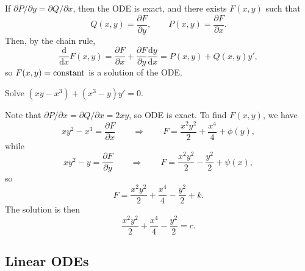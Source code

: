 \documentclass[letter-paper]{tufte-book}
\newenvironment{example}[1][Example]{\begin{trivlist}
\item[\hskip \labelsep {\bfseries #1}]}{\end{trivlist}}
\newcommand{\dy}{\partial}
\newcommand{\ddy}[2]{\frac{\dy#1}{\dy#2}}
\begin{document}
If $\dy P/\dy y=\dy Q/\dy x$, then the ODE is exact, and there exists $F(x,y)$
such that
\begin{equation*}
  Q(x,y)=\ddy{F}{y},\qquad P(x,y)=\ddy{F}{x}.
\end{equation*}
Then, by the chain rule,
\begin{equation*}
  \frac{\mathrm{d}}{\mathrm{d}x}F(x,y)=
  \ddy{F}{x}+\ddy{F}{y}\frac{\mathrm{d}y}{\mathrm{d}x}
  =P(x,y)+Q(x,y)y',
\end{equation*}
so $F(x,y)=\textnormal{constant}$ is a solution of the ODE.
\begin{example}
  Solve $(xy-x^3)+(x^3-y)y'=0$.
  
  Note that $\dy P/\dy x=\dy Q/\dy x=2xy$, so ODE is exact. To find $F(x,y)$, we
  have
  \begin{equation*}
    xy^2-x^3=\ddy{F}{x}\qquad\Rightarrow\qquad
    F=\frac{x^2 y^2}{2}+\frac{x^4}{4}+\phi(y),
  \end{equation*}
  while
  \begin{equation*}
    xy^2-y=\ddy{F}{y}\qquad\Rightarrow\qquad
    F=\frac{x^2 y^2}{2}-\frac{y^2}{2}+\psi(x),
  \end{equation*}
  so
  \begin{equation*}
    F=\frac{x^2 y^2}{2}+\frac{x^4}{4}-\frac{y^2}{2}+k.
  \end{equation*}
  The solution is then
  \begin{equation*}
    \frac{x^2 y^2}{2}+\frac{x^4}{4}-\frac{y^2}{2}=c.
  \end{equation*}
\end{example}

\subsection{Linear ODEs}
\end{document}
